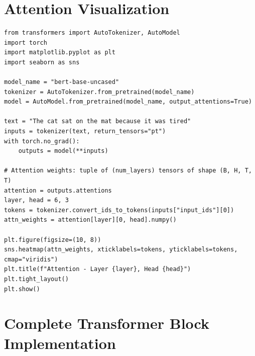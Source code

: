 \section{Attention Visualization}
\label{sec:att:visualization}

\begin{codeblock}[title=\textbf{Attention weight visualization with Hugging Face}]
\begin{verbatim}
from transformers import AutoTokenizer, AutoModel
import torch
import matplotlib.pyplot as plt
import seaborn as sns

model_name = "bert-base-uncased"
tokenizer = AutoTokenizer.from_pretrained(model_name)
model = AutoModel.from_pretrained(model_name, output_attentions=True)

text = "The cat sat on the mat because it was tired"
inputs = tokenizer(text, return_tensors="pt")
with torch.no_grad():
    outputs = model(**inputs)

# Attention weights: tuple of (num_layers) tensors of shape (B, H, T, T)
attention = outputs.attentions
layer, head = 6, 3
tokens = tokenizer.convert_ids_to_tokens(inputs["input_ids"][0])
attn_weights = attention[layer][0, head].numpy()

plt.figure(figsize=(10, 8))
sns.heatmap(attn_weights, xticklabels=tokens, yticklabels=tokens, cmap="viridis")
plt.title(f"Attention - Layer {layer}, Head {head}")
plt.tight_layout()
plt.show()
\end{verbatim}
\end{codeblock}

\section{Complete Transformer Block Implementation}
\label{sec:att:implementation}

